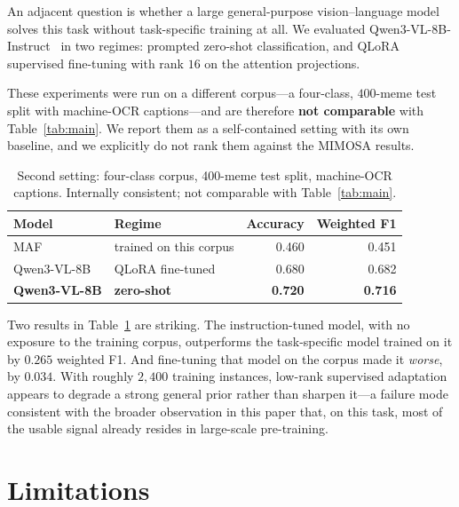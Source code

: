 \documentclass[conference]{IEEEtran}
\begin{document}
An adjacent question is whether a large general-purpose vision--language model
solves this task without task-specific training at all. We evaluated
Qwen3-VL-8B-Instruct~\cite{qwen3vl} in two regimes: prompted zero-shot
classification, and QLoRA~\cite{dettmers2023} supervised fine-tuning with rank
$16$ on the attention projections.

These experiments were run on a different corpus---a four-class, $400$-meme
test split with machine-OCR captions---and are therefore \textbf{not comparable}
with Table~\ref{tab:main}. We report them as a self-contained setting with its
own baseline, and we explicitly do not rank them against the MIMOSA results.

\begin{table}[t]
\caption{Second setting: four-class corpus, 400-meme test split, machine-OCR
captions. Internally consistent; not comparable with Table~\ref{tab:main}.}
\label{tab:vlm}
\centering
\footnotesize
\begin{tabular}{llrr}
\toprule
Model & Regime & Accuracy & Weighted F1 \\
\midrule
MAF                 & trained on this corpus & 0.460 & 0.451 \\
Qwen3-VL-8B         & QLoRA fine-tuned       & 0.680 & 0.682 \\
\textbf{Qwen3-VL-8B} & \textbf{zero-shot}    & \textbf{0.720} & \textbf{0.716} \\
\bottomrule
\end{tabular}
\end{table}

Two results in Table~\ref{tab:vlm} are striking. The instruction-tuned model,
with no exposure to the training corpus, outperforms the task-specific model
trained on it by $0.265$ weighted F1. And fine-tuning that model on the corpus
made it \emph{worse}, by $0.034$. With roughly $2{,}400$ training instances,
low-rank supervised adaptation appears to degrade a strong general prior rather
than sharpen it---a failure mode consistent with the broader observation in this
paper that, on this task, most of the usable signal already resides in
large-scale pre-training.

\section{Limitations}
\label{sec:limitations}
\end{document}
